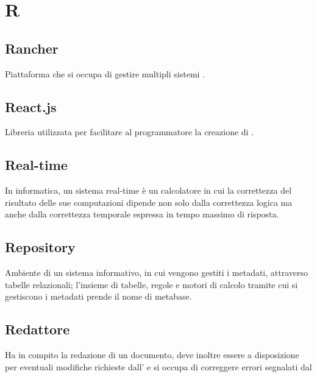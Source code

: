 \section*{R}
\markright{}

\subsection*{Rancher}
Piattaforma che si occupa di gestire multipli sistemi .

\subsection*{React.js}
Libreria  utilizzata per facilitare al programmatore la creazione di .

\subsection*{Real-time}
In informatica, un sistema real-time è un calcolatore in cui la correttezza del risultato delle sue computazioni dipende non solo dalla correttezza logica ma anche dalla correttezza temporale espressa in tempo massimo di risposta.

\subsection*{Repository}
Ambiente di un sistema informativo, in cui vengono gestiti i metadati, attraverso tabelle relazionali; l'insieme di tabelle, regole e motori di calcolo tramite cui si gestiscono i metadati prende il nome di metabase.  

\subsection*{Redattore}
Ha in compito la redazione di un documento, deve inoltre essere a disposizione per eventuali modifiche richieste dall' e si occupa di correggere errori segnalati dal 
